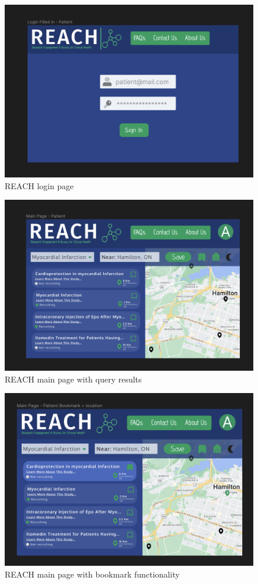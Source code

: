 \documentclass[12pt, titlepage]{article}
\begin{document}
\begin{figure}[H]
  \centering
  \includegraphics[width=0.9\linewidth]{images/Login.png}
  \caption{REACH login page}
  \label{fig:figure1}
\end{figure}
\begin{figure}[H]
  \centering
  \includegraphics[width=0.9\linewidth]{images/MainPage.png}
  \caption{REACH main page with query results}
  \label{fig:figure1}
\end{figure}
\begin{figure}[H]
  \centering
  \includegraphics[width=0.9\linewidth]{images/Bookmark.png}
  \caption{REACH main page with bookmark functionality}
  \label{fig:figure1}
\end{figure}
\end{document}
